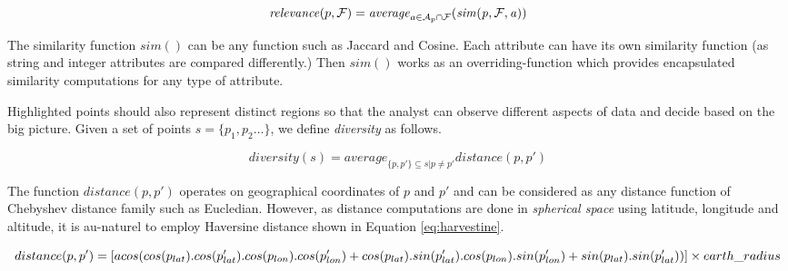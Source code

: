 \documentclass{vldb}
\newtheorem{definition}{Definition}
\begin{document}

\begin{dmath}
\label{eq:rel}
\mathit{relevance}(p,{\cal F}) = \mathit{average}_{a \in {\cal A}_{p} \cap {\cal F}}(\mathit{sim(p, {\cal F}, a)})
\end{dmath}

The similarity function $\mathit{sim}()$ can be any function such as Jaccard and Cosine. Each attribute can have its own similarity function (as string and integer attributes are compared differently.) Then $\mathit{sim}()$ works as an overriding-function which provides encapsulated similarity computations for any type of attribute.

\vspace{5pt}
 Highlighted points should also represent distinct regions so that the analyst can observe different aspects of data and decide based on the big picture. Given a set of points $s = \{ p_1, p_2 \dots \}$, we define {\em diversity} as follows.

\begin{dmath}
\label{eq:divs}
\mathit{diversity}(s) = \mathit{average}_{\{p, p'\} \subseteq s | p \neq p' } \mathit{distance}(p,p')
\end{dmath} 

The function $\mathit{distance}(p,p')$ operates on geographical coordinates of $p$ and $p'$ and can be considered as any distance function of Chebyshev distance family such as Eucledian. However, as distance computations are done in {\em spherical space} using latitude, longitude and altitude, it is au-naturel to employ Haversine distance shown in Equation \ref{eq:harvestine}.

\begin{dmath}
\label{eq:harvestine}
distance(p,p') = [ acos(cos(p_{lat}) . cos(p'_{lat}) . cos(p_{lon}) . cos(p'_{lon})\\ + cos(p_{lat}) . sin(p'_{lat}). cos(p_{lon}) . sin(p'_{lon}) + sin(p_{lat}) . sin(p'_{lat})) ] \times earth\_radius
\end{dmath}
\end{document}
